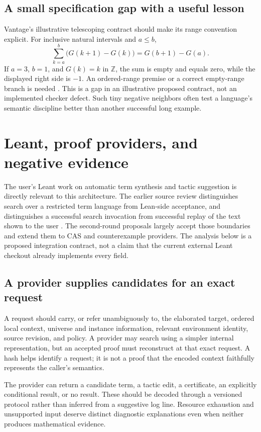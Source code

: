 \documentclass[11pt,letterpaper]{article}
\newcommand{\Z}{\mathbb Z}
\begin{document}
\subsection{A small specification gap with a useful lesson}
Vantage's illustrative telescoping contract should make its range convention
explicit. For inclusive natural intervals and \(a\le b\),
\[
 \sum_{k=a}^{b}\bigl(G(k+1)-G(k)\bigr)=G(b+1)-G(a).
\]
If \(a=3\), \(b=1\), and \(G(k)=k\) in \(\Z\), the sum is empty and
equals zero, while the displayed right side is \(-1\). An ordered-range
premise or a correct empty-range branch is needed
\cite[\S10.4]{vantage}. This is a gap in an illustrative proposed contract,
not an implemented checker defect. Such tiny negative neighbors often test a
language's semantic discipline better than another successful long example.

\section{Leant, proof providers, and negative evidence}\label{sec:leant}
The user's Leant work on automatic term synthesis and tactic suggestion is
directly relevant to this architecture. The earlier source review distinguishes
search over a restricted term language from Lean-side acceptance, and distinguishes
a successful search invocation from successful replay of the text shown to the
user \cite{round1,claude}. The second-round proposals largely accept those
boundaries and extend them to CAS and counterexample providers. The analysis
below is a proposed integration contract, not a claim that the current external
Leant checkout already implements every field.

\subsection{A provider supplies candidates for an exact request}
A request should carry, or refer unambiguously to, the elaborated target,
ordered local context, universe and instance information, relevant environment
identity, source revision, and policy. A provider may search using a simpler
internal representation, but an accepted proof must reconstruct at that exact
request. A hash helps identify a request; it is not a proof that the encoded
context faithfully represents the caller's semantics.

The provider can return a candidate term, a tactic edit, a certificate, an
explicitly conditional result, or no result. These should be decoded through a
versioned protocol rather than inferred from a suggestive log line. Resource
exhaustion and unsupported input deserve distinct diagnostic explanations even
when neither produces mathematical evidence.
\end{document}
